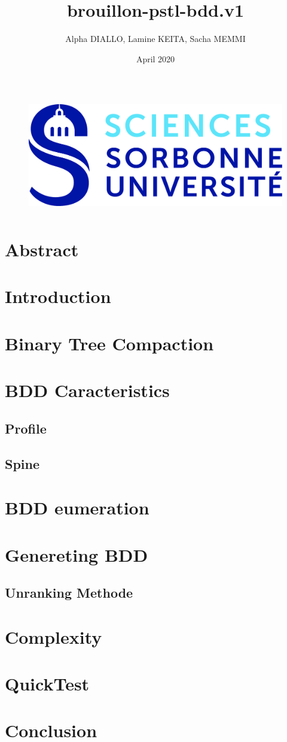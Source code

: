 \documentclass{article}
\title{brouillon-pstl-bdd.v1}
\author{Alpha DIALLO, Lamine KEITA, Sacha MEMMI}
\date{April 2020}
\begin{document}
\maketitle

\begin{figure}[htp]
    \centering
    \includegraphics[width=12cm, height=5cm]{logo_upmc}
    \label{fig:logo}
\end{figure}

\newpage
\tableofcontents
\newpage

\section{Abstract}
\section{Introduction}
\section{Binary Tree Compaction}
\section{BDD Caracteristics}
\subsection{Profile}
\subsection{Spine}
\section{BDD eumeration}
\section{Genereting BDD}
\subsection{Unranking Methode}
\section{Complexity}
\section{QuickTest}
\section{Conclusion}
\end{document}
